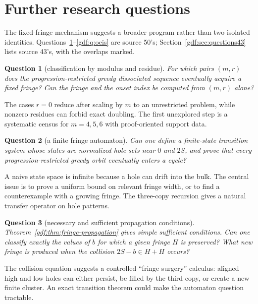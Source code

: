 \documentclass[11pt,a4paper]{article}
\numberwithin{equation}{section}
\theoremstyle{definition}
\theoremstyle{remark}
\theoremstyle{plain}
\newtheorem{question}{Question}
\begin{document}
\section{Further research questions}\label{gdf:sec:questions}

The fixed-fringe mechanism suggests a broader program rather than two isolated
identities.  Questions~\ref{gdf:q:classification}--\ref{gdf:q:oeis} are source
50's; Section~\ref{gdf:sec:questions43} lists source 43's, with the overlaps
marked.

\begin{question}[classification by modulus and residue]\label{gdf:q:classification}
For which pairs $(m,r)$ does the progression-restricted greedy dissociated
sequence eventually acquire a fixed fringe?  Can the fringe and the onset
index be computed from $(m,r)$ alone?
\end{question}

The cases $r=0$ reduce after scaling by $m$ to an unrestricted problem, while
nonzero residues can forbid exact doubling.  The first unexplored step is a
systematic census for $m=4,5,6$ with proof-oriented support data.

\begin{question}[a finite fringe automaton]\label{gdf:q:automaton}
Can one define a finite-state transition system whose states are normalized
hole sets near $0$ and $2S$, and prove that every progression-restricted
greedy orbit eventually enters a cycle?
\end{question}

A naive state space is infinite because a hole can drift into the bulk.  The
central issue is to prove a uniform bound on relevant fringe width, or to find
a counterexample with a growing fringe.  The three-copy recursion gives a
natural transfer operator on hole patterns.

\begin{question}[necessary and sufficient propagation conditions]\label{gdf:q:conditions}
Theorem~\ref{gdf:thm:fringe-propagation} gives simple sufficient conditions.
Can one classify exactly the values of $b$ for which a given fringe $H$ is
preserved?  What new fringe is produced when the collision
$2S-b\in H+H$ occurs?
\end{question}

The collision equation suggests a controlled ``fringe surgery'' calculus:
aligned high and low holes can either persist, be filled by the third copy, or
create a new finite cluster.  An exact transition theorem could make the
automaton question tractable.
\end{document}

